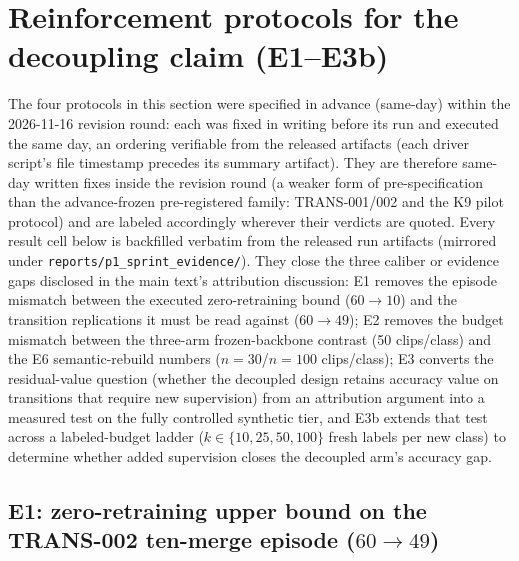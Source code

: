 \documentclass[11pt,a4paper]{article}
\begin{document}
\section{Reinforcement protocols for the decoupling claim (E1--E3b)}\label{app:reinforce}

The four protocols in this section were specified in advance (same-day) within the 2026-11-16 revision round: each was fixed in writing before its run and executed the same day, an ordering verifiable from the released artifacts (each driver script's file timestamp precedes its summary artifact). They are therefore same-day written fixes inside the revision round (a weaker form of pre-specification than the advance-frozen pre-registered family: TRANS-001/002 and the K9 pilot protocol) and are labeled accordingly wherever their verdicts are quoted. Every result cell below is backfilled verbatim from the released run artifacts (mirrored under \texttt{reports/p1\_sprint\_evidence/}). They close the three caliber or evidence gaps disclosed in the main text's attribution discussion: E1 removes the episode mismatch between the executed zero-retraining bound ($60\to10$) and the transition replications it must be read against ($60\to49$); E2 removes the budget mismatch between the three-arm frozen-backbone contrast (50 clips/class) and the E6 semantic-rebuild numbers ($n{=}30$/$n{=}100$ clips/class); E3 converts the residual-value question (whether the decoupled design retains accuracy value on transitions that require new supervision) from an attribution argument into a measured test on the fully controlled synthetic tier, and E3b extends that test across a labeled-budget ladder ($k\in\{10,25,50,100\}$ fresh labels per new class) to determine whether added supervision closes the decoupled arm's accuracy gap.

\subsection{E1: zero-retraining upper bound on the TRANS-002 ten-merge episode ($60\to49$)}\label{app:mergebound49}
\end{document}
